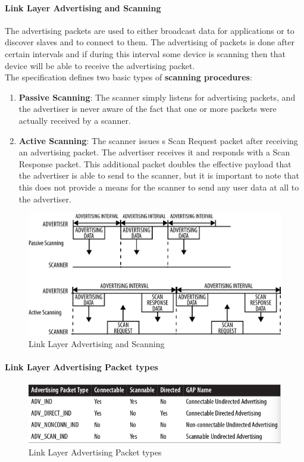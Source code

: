 \paragraph{Link Layer Advertising and Scanning}
The advertising packets are used to either broadcast data for applications or to discover slaves and to connect to them. The advertising of packets is done after certain intervals and if during this interval some device is scanning then that device will be able to receive the advertising packet.\\
The specification defines two basic types of \textbf{scanning procedures}:
\begin{enumerate}
	\item \textbf{Passive Scanning}: The scanner simply listens for advertising packets, and the advertiser is never aware of the fact that one or more packets were actually received by a scanner.
	\item \textbf{Active Scanning}: The scanner issues s Scan Request packet after receiving an advertising packet. The advertiser receives it and responds with a Scan Response packet. This additional packet doubles the effective payload that the advertiser is able to send to the scanner, but it is important to note that this does not provide a means for the scanner to send any user data at all to the advertiser.
\end{enumerate}
\begin{figure}[ht]
	\centering
	\includegraphics[scale=0.2]{images/advertising_scanning.png}
	\caption{Link Layer Advertising and Scanning}
\end{figure}
\paragraph{Link Layer Advertising Packet types}
\begin{figure}[ht]
	\centering
	\includegraphics[scale=0.5]{images/advertising_packet_types.png}
	\caption{Link Layer Advertising Packet types}
\end{figure}
